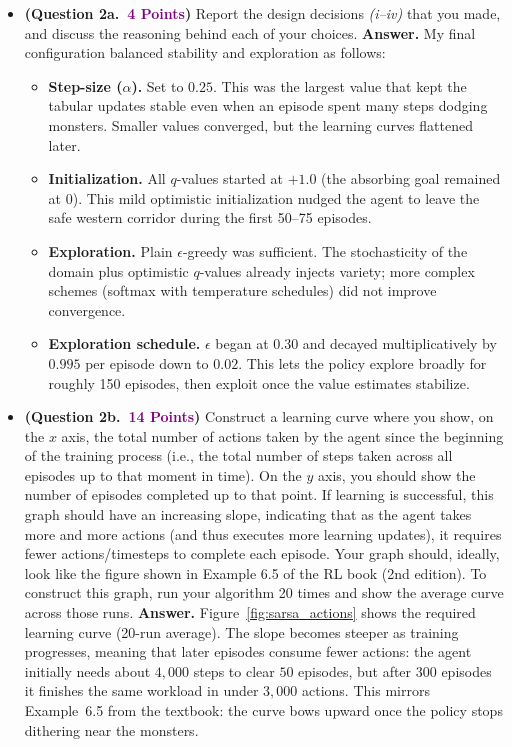 \documentclass{article}
\newcommand{\POINTS}[1]{\textcolor{purple}{\textbf{{#1}}}}
\begin{document}
\begin{itemize}


    \item \textbf{(Question 2a.~\POINTS{4 Points})} Report the design decisions \textit{(i--iv)} that you made, and discuss the reasoning behind each of your choices.
    \vspace{0.2cm}
    \textbf{Answer.} My final configuration balanced stability and exploration as follows:
    \begin{itemize}
        \item \textbf{Step-size ($\alpha$).} Set to $0.25$. This was the largest value that kept the tabular updates stable even when an episode spent many steps dodging monsters. Smaller values converged, but the learning curves flattened later.
        \item \textbf{Initialization.} All $q$-values started at $+1.0$ (the absorbing goal remained at $0$). This mild optimistic initialization nudged the agent to leave the safe western corridor during the first 50--75 episodes.
        \item \textbf{Exploration.} Plain $\epsilon$-greedy was sufficient. The stochasticity of the domain plus optimistic $q$-values already injects variety; more complex schemes (softmax with temperature schedules) did not improve convergence.
        \item \textbf{Exploration schedule.} $\epsilon$ began at $0.30$ and decayed multiplicatively by $0.995$ per episode down to $0.02$. This lets the policy explore broadly for roughly 150 episodes, then exploit once the value estimates stabilize.
    \end{itemize}



    \item \textbf{(Question 2b.~\POINTS{14 Points})} Construct a learning curve where you show, on the $x$ axis, the total number of actions taken by the agent since the beginning of the training process (i.e., the total number of steps taken across all episodes up to that moment in time). On the $y$ axis, you should show the number of episodes completed up to that point. If learning is successful, this graph should have an increasing slope, indicating that as the agent takes more and more actions (and thus executes more learning updates), it requires fewer actions/timesteps to complete each episode. Your graph should, ideally, look like the figure shown in Example 6.5 of the RL book (2nd edition). To construct this graph, run your algorithm 20 times and show the average curve across those runs.
    \vspace{0.2cm}
    \textbf{Answer.} Figure~\ref{fig:sarsa_actions} shows the required learning curve (20-run average). The slope becomes steeper as training progresses, meaning that later episodes consume fewer actions: the agent initially needs about $4{,}000$ steps to clear $50$ episodes, but after $300$ episodes it finishes the same workload in under $3{,}000$ actions. This mirrors Example~6.5 from the textbook: the curve bows upward once the policy stops dithering near the monsters.


\end{itemize}
\end{document}
